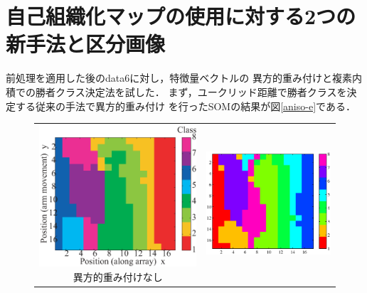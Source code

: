 ﻿\documentclass[12pt,oneside]{jsbook}
\begin{document}
\section{自己組織化マップの使用に対する2つの新手法と区分画像}
前処理を適用した後のdata6に対し，特徴量ベクトルの
異方的重み付けと複素内積での勝者クラス決定法を試した．
まず，ユークリッド距離で勝者クラスを決定する従来の手法で異方的重み付け
を行ったSOMの結果が図\ref{aniso-e}である．\\
\begin{figure}[btp]
 \begin{center}
\begin{tabular}{cc}
   \begin{minipage}{0.5\hsize}
\includegraphics[width =\hsize ]{SOM_mine6_02005_e_raw.eps}
\centering\textmd{異方的重み付けなし}
   \end{minipage}
&
   \begin{minipage}{0.5\hsize}
\includegraphics[width =\hsize ]{SOM_mine6_02005_e_wsqrt.eps}

\end{minipage}
\end{tabular}
\end{center}
\end{figure}
\end{document}
